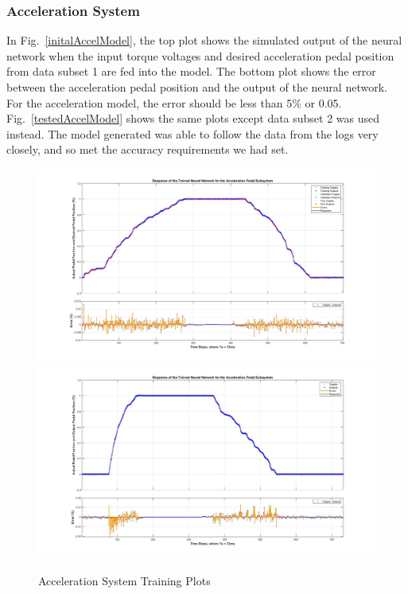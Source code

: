 \documentclass[conference]{IEEEtran}
\begin{document}
\subsubsection{Acceleration System}
%
In Fig.~\ref{initalAccelModel}, the top plot shows the simulated output of the neural network when the input torque voltages and desired acceleration pedal position from data subset 1 are fed into the model. The bottom plot shows the error between the acceleration pedal position and the output of the neural network. For the acceleration model, the error should be less than 5\% or 0.05. Fig.~\ref{testedAccelModel} shows the same plots except data subset 2 was used instead. The model generated was able to follow the data from the logs very closely, and so met the accuracy requirements we had set. 

\begin{figure}[htbp]
	\centering
		{\includegraphics[width=0.90\linewidth]{figs/img/accelNeuralNetworkTrainedOutput}}
		{\includegraphics[width=0.90\linewidth]{figs/img/accelNeuralNetworkTrainedOutput2}}
	\caption{Acceleration System Training Plots}
\end{figure}
\end{document}
